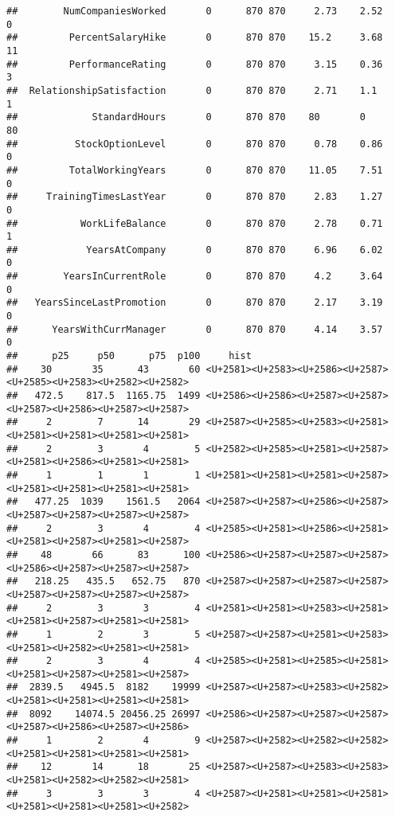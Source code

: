 \documentclass[]{article}
\begin{document}
\begin{verbatim}
##        NumCompaniesWorked       0      870 870     2.73    2.52    0
##         PercentSalaryHike       0      870 870    15.2     3.68   11
##         PerformanceRating       0      870 870     3.15    0.36    3
##  RelationshipSatisfaction       0      870 870     2.71    1.1     1
##             StandardHours       0      870 870    80       0      80
##          StockOptionLevel       0      870 870     0.78    0.86    0
##         TotalWorkingYears       0      870 870    11.05    7.51    0
##     TrainingTimesLastYear       0      870 870     2.83    1.27    0
##           WorkLifeBalance       0      870 870     2.78    0.71    1
##            YearsAtCompany       0      870 870     6.96    6.02    0
##        YearsInCurrentRole       0      870 870     4.2     3.64    0
##   YearsSinceLastPromotion       0      870 870     2.17    3.19    0
##      YearsWithCurrManager       0      870 870     4.14    3.57    0
##      p25     p50      p75  p100     hist
##    30       35      43       60 <U+2581><U+2583><U+2586><U+2587><U+2585><U+2583><U+2582><U+2582>
##   472.5    817.5  1165.75  1499 <U+2586><U+2586><U+2587><U+2587><U+2587><U+2586><U+2587><U+2587>
##     2        7      14       29 <U+2587><U+2585><U+2583><U+2581><U+2581><U+2581><U+2581><U+2581>
##     2        3       4        5 <U+2582><U+2585><U+2581><U+2587><U+2581><U+2586><U+2581><U+2581>
##     1        1       1        1 <U+2581><U+2581><U+2581><U+2587><U+2581><U+2581><U+2581><U+2581>
##   477.25  1039    1561.5   2064 <U+2587><U+2587><U+2586><U+2587><U+2587><U+2587><U+2587><U+2587>
##     2        3       4        4 <U+2585><U+2581><U+2586><U+2581><U+2581><U+2587><U+2581><U+2587>
##    48       66      83      100 <U+2586><U+2587><U+2587><U+2587><U+2586><U+2587><U+2587><U+2587>
##   218.25   435.5   652.75   870 <U+2587><U+2587><U+2587><U+2587><U+2587><U+2587><U+2587><U+2587>
##     2        3       3        4 <U+2581><U+2581><U+2583><U+2581><U+2581><U+2587><U+2581><U+2581>
##     1        2       3        5 <U+2587><U+2587><U+2581><U+2583><U+2581><U+2582><U+2581><U+2581>
##     2        3       4        4 <U+2585><U+2581><U+2585><U+2581><U+2581><U+2587><U+2581><U+2587>
##  2839.5   4945.5  8182    19999 <U+2587><U+2587><U+2583><U+2582><U+2581><U+2581><U+2581><U+2581>
##  8092    14074.5 20456.25 26997 <U+2586><U+2587><U+2587><U+2587><U+2587><U+2586><U+2587><U+2586>
##     1        2       4        9 <U+2587><U+2582><U+2582><U+2582><U+2581><U+2581><U+2581><U+2581>
##    12       14      18       25 <U+2587><U+2587><U+2583><U+2583><U+2581><U+2582><U+2582><U+2581>
##     3        3       3        4 <U+2587><U+2581><U+2581><U+2581><U+2581><U+2581><U+2581><U+2582>

\end{verbatim}
\end{document}
